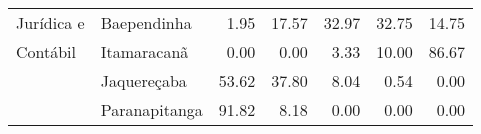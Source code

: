 \begin{table}[h]
\begin{tabular}{ll rrrrr}
    Jurídica e         	  & Baependinha             &               1.95 &        17.57 &       32.97 &      32.75 &            14.75 \\ 
	Contábil			  & Itamaracanã             &               0.00 &         0.00 &        3.33 &      10.00 &            86.67 \\ 
						  & Jaquereçaba             &              53.62 &        37.80 &        8.04 &       0.54 &             0.00 \\ 
                          & Paranapitanga           &              91.82 &         8.18 &        0.00 &       0.00 &             0.00 \\ 
   \bottomrule
\end{tabular}
\label{tabela:q15p}
\end{table}

